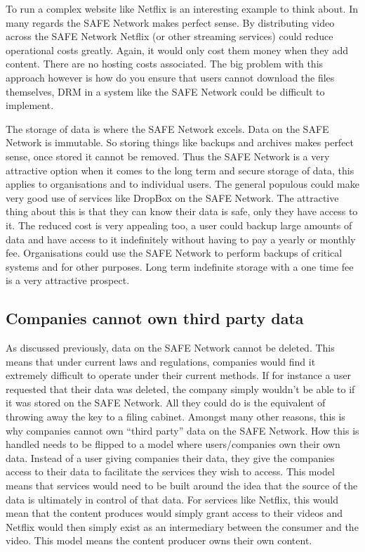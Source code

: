 To run a complex website like Netflix is an interesting example to think about. In many regards the SAFE Network makes perfect sense. By distributing video across the SAFE Network Netflix (or other streaming services) could reduce operational costs greatly. Again, it would only cost them money when they add content. There are no hosting costs associated. The big problem with this approach however is how do you ensure that users cannot download the files themselves, DRM in a system like the SAFE Network could be difficult to implement.

The storage of data is where the SAFE Network excels. Data on the SAFE Network is immutable. So storing things like backups and archives makes perfect sense, once stored it cannot be removed. Thus the SAFE Network is a very attractive option when it comes to the long term and secure storage of data, this applies to organisations and to individual users. The general populous could make very good use of services like DropBox on the SAFE Network. The attractive thing about this is that they can know their data is safe, only they have access to it. The reduced cost is very appealing too, a user could backup large amounts of data and have access to it indefinitely without having to pay a yearly or monthly fee. Organisations could use the SAFE Network to perform backups of critical systems and for other purposes. Long term indefinite storage with a one time fee is a very attractive prospect.

\subsection{Companies cannot own third party data}

As discussed previously, data on the SAFE Network cannot be deleted. This means that under current laws and regulations, companies would find it extremely difficult to operate under their current methods. If for instance a user requested that their data was deleted, the company simply wouldn't be able to if it was stored on the SAFE Network. All they could do is the equivalent of throwing away the key to a filing cabinet. Amongst many other reasons, this is why companies cannot own ``third party'' data on the SAFE Network. How this is handled needs to be flipped to a model where users/companies own their own data. Instead of a user giving companies their data, they give the companies access to their data to facilitate the services they wish to access. This model means that services would need to be built around the idea that the source of the data is ultimately in control of that data. For services like Netflix, this would mean that the content produces would simply grant access to their videos and Netflix would then simply exist as an intermediary between the consumer and the video. This model means the content producer owns their own content.

